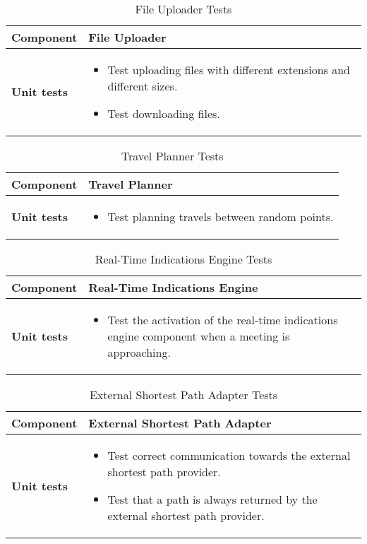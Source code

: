 \begin{table}[H]	
	\centering
	\def\arraystretch{1.5}
	\begin{tabular}{|m{4cm}|m{12cm}|}
		\hline
		\textbf{Component} & File Uploader \\ \hline
		\textbf{Unit tests} & 
			\begin{itemize}
			\item Test uploading files with different extensions and different sizes.
			\item Test downloading files.
			\end{itemize} \\ \hline
	\end{tabular}
	\caption{File Uploader Tests}
\end{table}

\begin{table}[H]	
	\centering
	\def\arraystretch{1.5}
	\begin{tabular}{|m{4cm}|m{12cm}|}
		\hline
		\textbf{Component} & Travel Planner \\ \hline
		\textbf{Unit tests} & 
			\begin{itemize}
			\item Test planning travels between random points.
			\end{itemize} \\ \hline
	\end{tabular}
	\caption{Travel Planner Tests}
\end{table}

\begin{table}[H]	
	\centering
	\def\arraystretch{1.5}
	\begin{tabular}{|m{4cm}|m{12cm}|}
		\hline
		\textbf{Component} & Real-Time Indications Engine \\ \hline
		\textbf{Unit tests} & 
			\begin{itemize}
			\item Test the activation of the real-time indications engine component when a meeting is approaching.
			\end{itemize} \\ \hline
	\end{tabular}
	\caption{Real-Time Indications Engine Tests}
\end{table}

\begin{table}[H]	
	\centering
	\def\arraystretch{1.5}
	\begin{tabular}{|m{4cm}|m{12cm}|}
		\hline
		\textbf{Component} & External Shortest Path Adapter \\ \hline
		\textbf{Unit tests} & 
			\begin{itemize}
			\item Test correct communication towards the external shortest path provider.
			\item Test that a path is always returned by the external shortest path provider. 
			\end{itemize} \\ \hline
	\end{tabular}
	\caption{External Shortest Path Adapter Tests}
\end{table}


